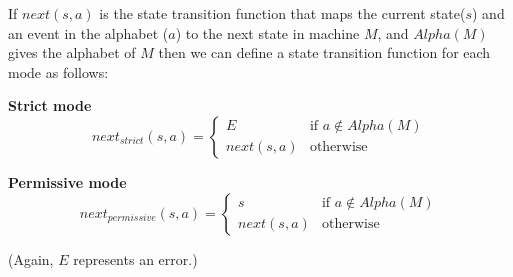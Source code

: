 \documentclass[12pt,a4paper]{article}
\begin{document}
If $next(s, a)$ is the state transition function that maps the current state($s$) and an event in the alphabet ($a$) to the next state in machine $M$, and $Alpha(M)$ gives the alphabet of $M$ then we can define a state transition function for each mode as follows:\\

\begin{center}
\textbf{Strict mode}
\[
 next_{strict}(s, a) =
  \begin{cases} 
   E & \text{if } a \notin Alpha(M) \\
   next(s,a) & \text{otherwise } 
  \end{cases}
\]
\end{center}

\begin{center}
\textbf{Permissive mode}
\[
 next_{permissive}(s, a) =
  \begin{cases} 
   s & \text{if } a \notin Alpha(M) \\
   next(s,a) & \text{otherwise } 
  \end{cases}
\]
\end{center}
\noindent (Again, $E$ represents an error.)
\end{document}
